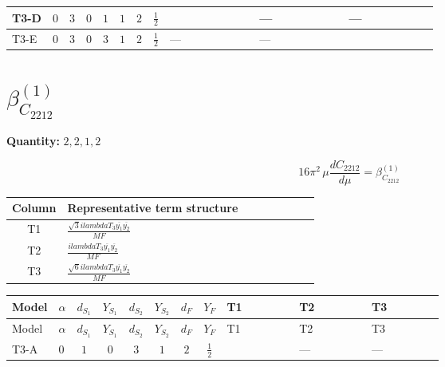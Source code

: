 \documentclass[8pt]{article}
\begin{document}
\begin{landscape}
\begin{longtable}{@{}llcccccc >{\raggedright\arraybackslash}p{0.21\linewidth} >{\raggedright\arraybackslash}p{0.21\linewidth} >{\raggedright\arraybackslash}p{0.21\linewidth}@{}}
\midrule
T3-D & $0$ & $3$ & $0$ & $1$ & $1$ & $2$ & $\frac{1}{2}$ & \scriptsize\adjustbox{max width=\linewidth}{$\begin{gathered} \frac{2 \sqrt{3} lambdaT_{3} \overline{y_{1}} \overline{y_{2}}}{3 MF}\end{gathered}$} & --- & --- \\
\midrule
T3-E & $0$ & $3$ & $0$ & $3$ & $1$ & $2$ & $\frac{1}{2}$ & --- & --- & \scriptsize\adjustbox{max width=\linewidth}{$\begin{gathered} - \frac{2 \sqrt{6} lambdaT_{3} \overline{y_{1}} \overline{y_{2}}}{3 MF}\end{gathered}$} \\
\midrule
\bottomrule
\end{longtable}
\clearpage
\section*{$\beta_{C_{2212}}^{(1)}$}
\noindent\textbf{Quantity: }$\mathrm{2,2,1,2}$\par\smallskip
\[16\pi^2\,\mu\frac{d C_{2212}}{d\mu}=\beta_{C_{2212}}^{(1)}\]
\begin{center}
\begin{tabular}{@{}c >{\raggedright\arraybackslash}p{0.82\linewidth}@{}}
\toprule
Column & Representative term structure \\
\midrule
T1 & \(\displaystyle \frac{\sqrt{3} i lambdaT_{3} \overline{y_{1}} \overline{y_{2}}}{MF}\) \\
\midrule
T2 & \(\displaystyle \frac{i lambdaT_{3} \overline{y_{1}} \overline{y_{2}}}{MF}\) \\
\midrule
T3 & \(\displaystyle \frac{\sqrt{6} i lambdaT_{3} \overline{y_{1}} \overline{y_{2}}}{MF}\) \\
\midrule
\bottomrule
\end{tabular}
\end{center}
\smallskip
\tiny
\begin{longtable}{@{}llcccccc >{\raggedright\arraybackslash}p{0.21\linewidth} >{\raggedright\arraybackslash}p{0.21\linewidth} >{\raggedright\arraybackslash}p{0.21\linewidth}@{}}
\toprule
Model & $\alpha$ & $d_{S_1}$ & $Y_{S_1}$ & $d_{S_2}$ & $Y_{S_2}$ & $d_F$ & $Y_F$ & T1 & T2 & T3 \\
\midrule
\endfirsthead
\toprule
Model & $\alpha$ & $d_{S_1}$ & $Y_{S_1}$ & $d_{S_2}$ & $Y_{S_2}$ & $d_F$ & $Y_F$ & T1 & T2 & T3 \\
\midrule
\endhead
T3-A & $0$ & $1$ & $0$ & $3$ & $1$ & $2$ & $\frac{1}{2}$ & \scriptsize\adjustbox{max width=\linewidth}{$\begin{gathered} \frac{2 \sqrt{3} i lambdaT_{3} \overline{y_{1}} \overline{y_{2}}}{3 MF}\end{gathered}$} & --- & --- \\

\end{longtable}
\end{landscape}
\end{document}
